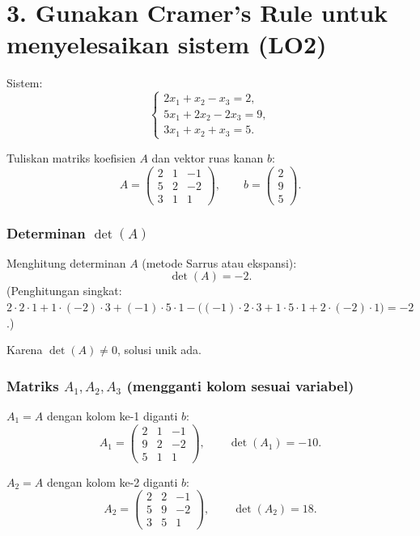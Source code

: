 \documentclass[12pt]{article}
\begin{document}
\section*{3. Gunakan Cramer’s Rule untuk menyelesaikan sistem (LO2)}

Sistem:
\[
\begin{cases}
2x_1 + x_2 - x_3 = 2,\\[4pt]
5x_1 + 2x_2 -2x_3 = 9,\\[4pt]
3x_1 + x_2 + x_3 = 5.
\end{cases}
\]

Tuliskan matriks koefisien $A$ dan vektor ruas kanan $b$:
\[
A = \begin{pmatrix}
2 & 1 & -1 \\
5 & 2 & -2 \\
3 & 1 & 1
\end{pmatrix}, \qquad
b = \begin{pmatrix}
2 \\
9 \\
5
\end{pmatrix}.
\]

\subsubsection*{Determinan $\det(A)$}
Menghitung determinan $A$ (metode Sarrus atau ekspansi):
\[
\det(A) = -2.
\]
(Penghitungan singkat: $2\cdot2\cdot1 + 1\cdot(-2)\cdot3 + (-1)\cdot5\cdot1 -\big((-1)\cdot2\cdot3 + 1\cdot5\cdot1 + 2\cdot(-2)\cdot1\big) = -2$.)

Karena $\det(A)\neq 0$, solusi unik ada.

\subsubsection*{Matriks $A_1,A_2,A_3$ (mengganti kolom sesuai variabel)}

\item $A_1 = A$ dengan kolom ke-1 diganti $b$:
    \[
    A_1 = \begin{pmatrix}
    2 & 1 & -1 \\
    9 & 2 & -2 \\
    5 & 1 & 1
    \end{pmatrix},
    \qquad \det(A_1) = -10.
    \]

    \item $A_2 = A$ dengan kolom ke-2 diganti $b$:
    \[
    A_2 = \begin{pmatrix}
    2 & 2 & -1 \\
    5 & 9 & -2 \\
    3 & 5 & 1
    \end{pmatrix},
    \qquad \det(A_2) = 18.
    \]
\end{document}

